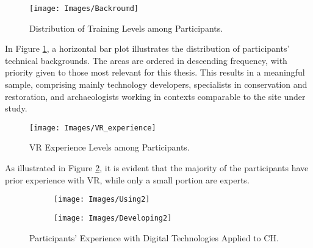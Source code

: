 \begin{figure}[h!]
    \centering
    \texttt{[image: Images/Backroumd]}
    \caption{Distribution of Training Levels among Participants.} 
    \label{fig:background}
\end{figure}

In Figure \ref{fig:background}, a horizontal bar plot illustrates the distribution of participants’ technical backgrounds. 
The areas are ordered in descending frequency, with priority given to those most relevant for this thesis. 
This results in a meaningful sample, comprising mainly technology developers, specialists in conservation and restoration, and archaeologists working in contexts comparable to the site under study.

\begin{figure}[h!]
    \centering
    \texttt{[image: Images/VR\_experience]}
    \caption{\gls{VR} Experience Levels among Participants.} 
    \label{fig:VR_experience}
\end{figure}

As illustrated in Figure \ref{fig:VR_experience}, it is evident that the majority of the participants have prior experience with \gls{VR}, while only a small portion are experts.

\begin{figure}[h!]
  \centering
  \begin{subfigure}[b]{0.47\textwidth}
      \centering
      \texttt{[image: Images/Using2]}
      \label{fig:Using}
  \end{subfigure}
  \hfill
  \begin{subfigure}[b]{0.47\textwidth}
      \centering
      \texttt{[image: Images/Developing2]}
      \label{fig:Developing}
  \end{subfigure}
     \caption{Participants’ Experience with Digital Technologies Applied to \gls{CH}.}
     \label{fig:hertiage_techs}
\end{figure}
\FloatBarrier

